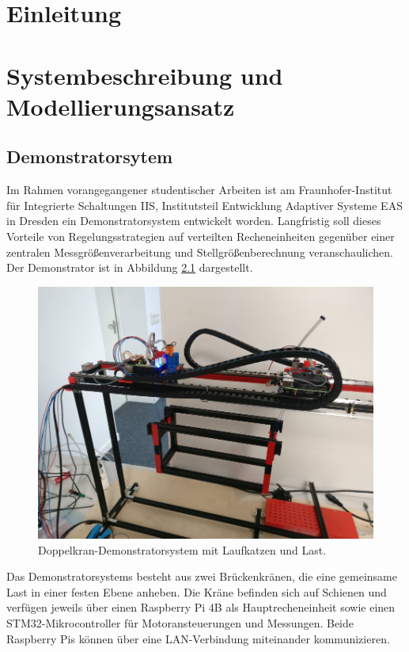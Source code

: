 \pagestyle{scrheadings}

\chapter{Einleitung}


\chapter{Systembeschreibung und Modellierungsansatz}

\section{Demonstratorsytem}
Im Rahmen vorangegangener studentischer Arbeiten ist am Fraunhofer-Institut für Integrierte Schaltungen IIS, Institutsteil Entwicklung Adaptiver Systeme EAS \cite{fraunhoferIISEAS} in Dresden ein Demonstratorsystem entwickelt worden. Langfristig soll dieses Vorteile von Regelungsstrategien auf verteilten Recheneinheiten gegenüber einer zentralen Messgrößenverarbeitung und Stellgrößenberechnung veranschaulichen. Der Demonstrator ist in Abbildung \ref{fig:demonstrator_real} dargestellt.

\begin{figure}[ht]
	\centering
	\includegraphics[width=0.75 \textwidth]{Pictures/real_gantry.jpg}
	\caption{Doppelkran-Demonstratorsystem mit Laufkatzen und Last.}
	\label{fig:demonstrator_real}
\end{figure}

Das Demonstratorsystems besteht aus zwei Brückenkränen, die eine gemeinsame Last in einer festen Ebene anheben. Die Kräne befinden sich auf Schienen und verfügen jeweils über einen Raspberry Pi 4B als Hauptrecheneinheit sowie einen STM32-Mikrocontroller für Motoransteuerungen und Messungen. Beide Raspberry Pis können über eine LAN-Verbindung miteinander kommunizieren.


